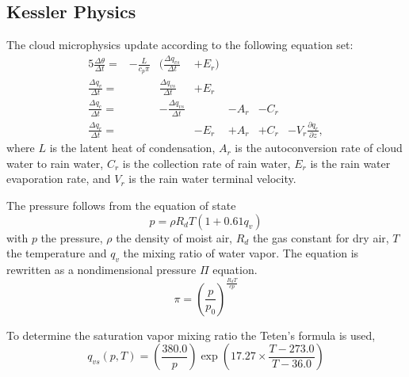 \documentclass[times,doublespace]{fldauth}
\newcommand{\pdiff}[2]{\frac{\partial #1}{\partial #2}}
\begin{document}
{%




\begin{appendix}


\section{Kessler Physics} \label{sec:KesslerPhysics}

The cloud microphysics update according to the following equation set:
\begin{alignat}{5}
\frac{\Delta \theta}{\Delta t} = & - \frac{L}{c_p \pi} & \Big( \frac{\Delta q_{vs}}{\Delta t} & + E_r  \Big) & \\
\frac{\Delta q_v}{\Delta t} = & & \frac{\Delta q_{vs}}{\Delta t} & + E_r \\
\frac{\Delta q_c}{\Delta t} = & & - \frac{\Delta q_{vs}}{\Delta t} & & - A_r & - C_r \\
\frac{\Delta q_r}{\Delta t} = & & & - E_r & + A_r & + C_r & - V_r \pdiff{q_r}{z},
\end{alignat} where $L$ is the latent heat of condensation, $A_r$ is the autoconversion rate of cloud water to rain water, $C_r$ is the collection rate of rain water, $E_r$ is the rain water evaporation rate, and $V_r$ is the rain water terminal velocity.

The pressure follows from the equation of state
\begin{equation}
p=\rho R_dT(1+0.61q_v)
\end{equation} with $p$ the pressure, $\rho$ the density of moist air, $R_d$ the gas constant for dry air, $T$ the temperature and $q_v$ the mixing ratio of water vapor. The equation is rewritten as a nondimensional pressure $\Pi$ equation.
\begin{equation}
\pi = \left(\frac{p}{p_0}\right)^{\frac{R_dT}{cp}}
\end{equation}

To determine the saturation vapor mixing ratio the Teten's formula is used,
\begin{equation}
q_{vs}(p,T) = \left( \frac{380.0}{p} \right) \exp\left(17.27 \times \frac{T-273.0}{T-36.0}\right)
\end {equation}


\end{appendix}}
\end{document}
